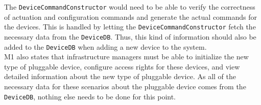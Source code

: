         The \texttt{DeviceCommandConstructor} would need to be able to verify the correctness of actuation
        and configuration commands and generate the actual commands for the devices. This is handled
        by letting the \texttt{DeviceCommandConstructor} fetch the necessary data from the \texttt{DeviceDB}.
        Thus, this kind of information should also be added to the \texttt{DeviceDB} when adding a
        new device to the system.\\

        M1 also states that infrastructure managers must be able to initialize the new type
        of pluggable device, configure access rights for these devices, and
        view detailed information about the new type of pluggable device.
        As all of the necessary data for these scenarios about the pluggable device comes from the \texttt{DeviceDB},
        nothing else needs to be done for this point.
